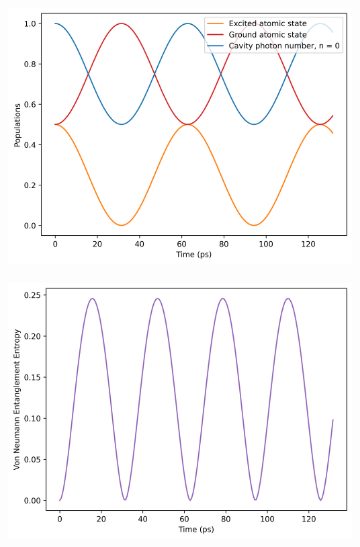 \documentclass[12pt]{article}
\begin{document}
\begin{figure}[h]
    \centering
    \begin{subfigure}{0.45\textwidth}
        \centering
        \includegraphics[width=\linewidth]{Research Project/Code/results/JCM/CQS_expt_eg.png}
        \caption{}
        \label{fig:jcm_cqs_expt_eg}
    \end{subfigure}
    \hfill
    \begin{subfigure}{0.45\textwidth}
        \centering
        \includegraphics[width=\linewidth]{Research Project/Code/results/JCM/CQS_vne_eg.png}
        \caption{}
        \label{fig:jcm_cqs_vne_eg}
    \end{subfigure}
    
    \vspace{0.5cm}
    

\end{figure}
\end{document}
